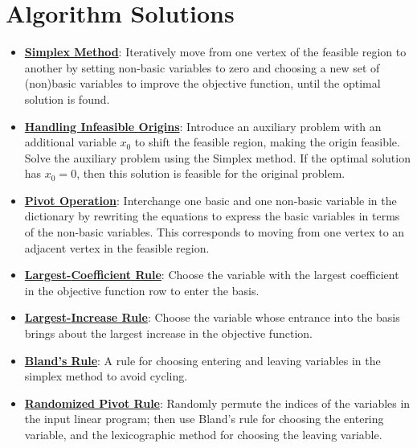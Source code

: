 \documentclass{article}%
\begin{document}
%
\section{Algorithm Solutions}%
\label{sec:AlgorithmSolutions}%
\begin{itemize}[leftmargin=*]%
\item \href{https://www.math.purdue.edu/~yipn/421/2024-08-27-ExSimplex.pdf#page=6}{\textbf{Simplex Method}}: Iteratively move from one vertex of the feasible region to another by setting non-basic variables to zero and choosing a new set of (non)basic variables to improve the objective function, until the optimal solution is found.%
\item \href{https://www.math.purdue.edu/~yipn/421/2024-08-27-ExSimplex.pdf#page=30}{\textbf{Handling Infeasible Origins}}: Introduce an auxiliary problem with an additional variable  $x_0$ to shift the feasible region, making the origin feasible. Solve the auxiliary problem using the Simplex method. If the optimal solution has $x_0 = 0$, then this solution is feasible for the original problem.%
\item \href{https://www.math.purdue.edu/~yipn/421/2024-08-27-ExSimplex.pdf#page=9}{\textbf{Pivot Operation}}: Interchange one basic and one non-basic variable in the dictionary by rewriting the equations to express the basic variables in terms of the non-basic variables. This corresponds to moving from one vertex to an adjacent vertex in the feasible region.%
\item \href{https://www.math.purdue.edu/~yipn/421/2024-09-05-SimplexEfficiency.pdf#page=3}{\textbf{Largest{-}Coefficient Rule}}: Choose the variable with the largest coefficient in the objective function row to enter the basis. %
\item \href{https://www.math.purdue.edu/~yipn/421/2024-09-05-SimplexEfficiency.pdf#page=6}{\textbf{Largest{-}Increase Rule}}: Choose the variable whose entrance into the basis brings about the largest increase in the objective function. %
\item \href{https://www.math.purdue.edu/~yipn/421/2024-09-05-SimplexEfficiency.pdf#page=10}{\textbf{Bland's Rule}}: A rule for choosing entering and leaving variables in the simplex method to avoid cycling. %
\item \href{https://www.math.purdue.edu/~yipn/421/2024-09-05-SimplexEfficiency.pdf#page=10}{\textbf{Randomized Pivot Rule}}: Randomly permute the indices of the variables in the input linear program; then use Bland's rule for choosing the entering variable, and the lexicographic method for choosing the leaving variable. %

\end{itemize}
\end{document}
